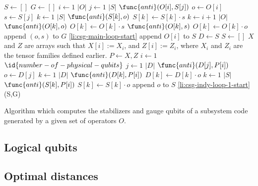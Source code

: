 \documentclass[twocolumn,showpacs,preprintnumbers,amsmath,amssymb,nofootinbib,pra,floatfix]{revtex4}
\begin{document}
\begin{table*}
\label{SG-algorithm}
\begin{codebox}
\li $S \gets []$
\li $G\gets []$
\li \For $i \gets 1$ \To $|O|$ \label{li:csg-main-loop-start}
\li \Do
\li      \For $j \gets 1$ \To $|S|$
\li      \Do
\li        \If $\func{anti}(O[i],S[j])$
\li        \Then
\li              $o \gets O[i]$
\li              $s \gets S[j]$
\li               \For $k \gets 1$ \To $|S|$
\li                   \Do
\li                        {} $\func{anti}(S[k],o)$  $S[k] \gets S[k]\cdot s$
                       \End 
\li               \For $k \gets i+1$ \To $|O|$
\li                  \Do
\li                        {} $\func{anti}(O[k],o)$  $O[k] \gets O[k]\cdot s$
\li                        {} $\func{anti}(O[k],s)$  $O[k] \gets O[k]\cdot o$
                       \End
\li             append $(o,s)$ to $G$
\li             \Goto \ref{li:csg-main-loop-start}
              \End
            \End
\li      append $O[i]$ to $S$
      \End
\li $D \gets S$
\li $S \gets []$
\zi \Comment $X$ and $Z$ are arrays such that
  $X[i]:=X_i$, and $Z[i]:=Z_i$, where $X_i$ and $Z_i$ are the tensor
  families defined earlier.
\li \For $P\gets X,Z$
\li \Do %
\li   \For $i \gets 1$ \To $\id{number-of-physical-qubits}$ \label{li:csg-indy-loop-1-start}
\li   \Do %
\li     \For $j \gets 1$ \To $|D|$
\li     \Do %
\li         \If $\func{anti}(D[j],P[i])$
\li         \Then
\li            $o \gets D[j]$
\li             \For $k \gets 1$ \To $|D|$
\li             \Do %
\li                 {} $\func{anti}(D[k],P[i])$  $D[k] \gets D[k]\cdot o$
                 \End %
\li             \For $k \gets 1$ \To $|S|$
\li             \Do %
\li                 {} $\func{anti}(S[k],P[i])$  $S[k] \gets S[k]\cdot o$
                  \End %
\li             append $o$ to $S$
\li            \Goto \ref{li:csg-indy-loop-1-start}
              \End %
           \End %
          \End %
        \End %
\li \Return (S,G)
\end{codebox}
\caption{Algorithm which computes the stabilizers and gauge qubits of
  a subsystem code generated by a given set of operators $O$.}
\end{table*}
\subsection{Logical qubits}

\label{logical-qubits}
\subsection{Optimal distances}

\label{optimal-distances}
\end{document}
